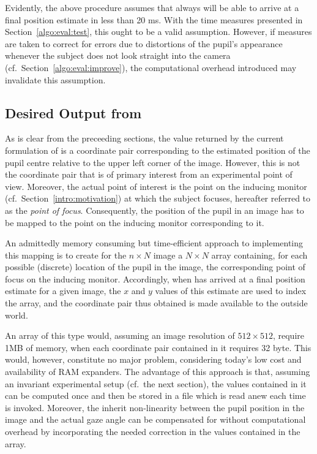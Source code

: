 Evidently, the above procedure assumes that {\octopus} always will be
able to arrive at a final position estimate in less than 20 ms.  With
the time measures presented in Section~\ref{algo:eval:test}, this
ought to be a valid assumption.  However, if measures are taken to
correct for errors due to distortions of the pupil's appearance
whenever the subject does not look straight into the camera (cf.\ 
Section~\ref{algo:eval:improve}), the computational overhead
introduced may invalidate this assumption.

\subsection{Desired Output from {\octopus}}
\label{algo:future:output}

As is clear from the preceeding sections, the value returned by the
current formulation of {\octopus} is a coordinate pair corresponding
to the estimated position of the pupil centre relative to the upper
left corner of the image.  However, this is not the coordinate pair
that is of primary interest from an experimental point of view.
Moreover, the actual point of interest is the point on the inducing
monitor (cf.\ Section~\ref{intro:motivation}) at which the subject
focuses, hereafter referred to as the {\em point of focus\/}.
Consequently, the position of the pupil in an image has to be mapped
to the point on the inducing monitor corresponding to it.

An admittedly memory consuming but time-efficient approach to
implementing this mapping is to create for the $n\times N$ image a
$N\times N$ array containing, for each possible (discrete) location of
the pupil in the image, the corresponding point of focus on the
inducing monitor.  Accordingly, when {\octopus} has arrived at a final
position estimate for a given image, the $x$ and $y$ values of this
estimate are used to index the array, and the coordinate pair thus
obtained is made available to the outside world.

An array of this type would, assuming an image resolution of
$512\times 512$, require 1MB of memory, when each coordinate pair
contained in it requires 32 byte.  This would, however, constitute no
major problem, considering today's low cost and availability of RAM
expanders.  The advantage of this approach is that, assuming an
invariant experimental setup (cf.\ the next section), the values
contained in it can be computed once and then be stored in a file
which is read anew each time {\octopus} is invoked.  Moreover, the
inherit non-linearity between the pupil position in the image and the
actual gaze angle can be compensated for without computational
overhead by incorporating the needed correction in the values
contained in the array.

